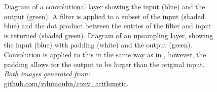 \documentclass[11pt,a4paper,onecolumn]{report}
\begin{document}
\begin{figure}%
  \centering
  \qquad
  \caption[ Diagram of a convolutional layer
   Diagram of an upsampling
  layer]{ Diagram of a convolutional layer showing the
  input (blue) and the output (green). A filter is applied to a subset of the
  input (shaded blue) and the dot product between the entries of the filter and
  input is returned (shaded green).  Diagram of an upsampling layer, showing the input
  (blue) with padding (white) and the output (green). Convolution is applied to
  this in the same way as in , however, the padding
  allows for the output to be larger than the original input. \textit{Both images generated from:}
  \url{github.com/vdumoulin/conv_arithmetic}.}
  \end{figure}

%
\end{document}
